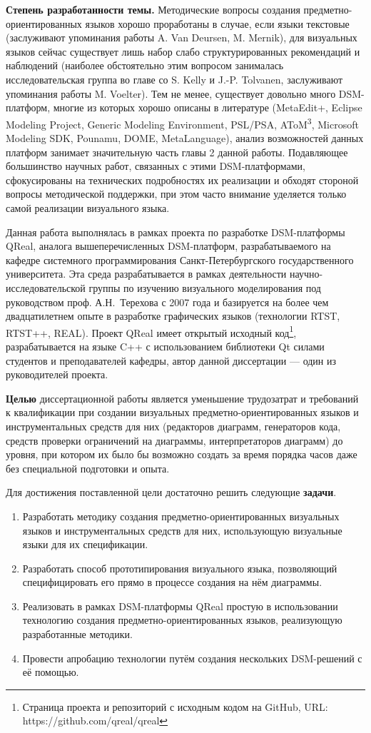 \textbf{Степень разработанности темы.}
Методические вопросы создания предметно-ориентированных языков хорошо проработаны в случае, если 
языки текстовые (заслуживают упоминания работы A. Van Deursen, M. Mernik), для визуальных
языков сейчас существует лишь набор слабо структурированных рекомендаций и наблюдений
(наиболее обстоятельно этим вопросом занималась исследовательская группа во главе 
со S. Kelly и J.-P. Tolvanen, заслуживают упоминания работы M. Voelter). Тем не менее, 
существует довольно много DSM-платформ, многие из которых хорошо описаны в литературе 
(MetaEdit+, Eclipse Modeling Project, Generic Modeling Environment, PSL/PSA, AToM\textsuperscript{3},
Microsoft Modeling SDK, Pounamu, DOME, MetaLanguage), анализ возможностей данных
платформ занимает значительную часть главы 2 данной работы. Подавляющее большинство 
научных работ, связанных с этими DSM-платформами, сфокусированы на технических подробностях
их реализации и обходят стороной вопросы методической поддержки, при этом часто внимание 
уделяется только самой реализации визуального языка.

Данная работа выполнялась в рамках проекта по разработке DSM-платформы QReal, аналога
вышеперечисленных DSM-платформ, разрабатываемого на кафедре системного программирования
Санкт-Петербургского государственного университета. Эта среда разрабатывается в рамках 
деятельности научно-исследовательской группы по изучению визуального моделирования 
под руководством проф. А.Н.~Терехова с 2007 года и базируется на более чем двадцатилетнем 
опыте в разработке графических языков (технологии RTST, RTST++, REAL). Проект QReal имеет 
открытый исходный код\footnote{Страница проекта и репозиторий с исходным кодом на GitHub, URL: https://github.com/qreal/qreal}, 
разрабатывается на языке C++ с использованием библиотеки Qt силами студентов и преподавателей 
кафедры, автор данной диссертации --- один из руководителей проекта.

\textbf{Целью} диссертационной работы является уменьшение трудозатрат и требований к квалификации
при создании визуальных предметно-ориентированных языков и инструментальных средств для них (редакторов диаграмм, 
генераторов кода, средств проверки ограничений на диаграммы, интерпретаторов диаграмм)
до уровня, при котором их было бы возможно создать за время порядка часов даже без 
специальной подготовки и опыта.

Для достижения поставленной цели достаточно решить следующие \textbf{задачи}.
\begin{enumerate}
	\item Разработать методику создания предметно-ориентированных визуальных языков и инструментальных 
		средств для них, использующую визуальные языки для их спецификации.
	\item Разработать способ прототипирования визуального языка, позволяющий специфицировать его
		прямо в процессе создания на нём диаграммы.
	\item Реализовать в рамках DSM-платформы QReal простую в использовании технологию 
		создания предметно-ориентированных языков, реализующую разработанные методики.
	\item Провести апробацию технологии путём создания нескольких DSM-решений с её помощью.
\end{enumerate}

